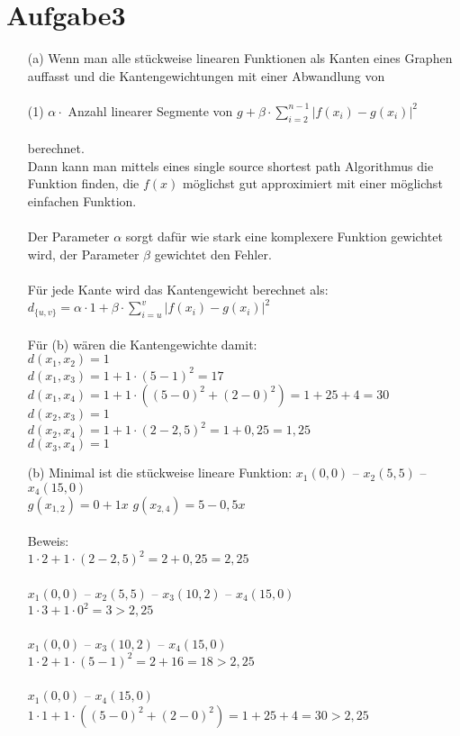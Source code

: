 \documentclass{article}
\begin{document}
\section*{Aufgabe3}
\begin{enumerate}
\item[(a)] Wenn man alle stückweise linearen Funktionen als Kanten eines Graphen auffasst und die Kantengewichtungen mit einer Abwandlung von \\\\
(1) $ \alpha \cdot$ Anzahl linearer Segmente von $g + \beta \cdot \sum_{i=2}^{n-1} \lvert f(x_i)-g(x_i) \lvert ^2$ \\\\
berechnet. \\
Dann kann man mittels eines single source shortest path Algorithmus die Funktion finden, die $f(x)$ möglichst gut approximiert mit einer möglichst einfachen Funktion. \\\\
Der Parameter $\alpha$ sorgt dafür wie stark eine komplexere Funktion gewichtet wird, der Parameter $\beta$ gewichtet den Fehler.\\\\
Für jede Kante wird das Kantengewicht berechnet als:\\
 $d_{\{u,v\}} = \alpha \cdot 1 + \beta \cdot \sum_{i=u}^{v} \lvert f(x_i)-g(x_i) \lvert ^2$\\\\
 Für (b) wären die Kantengewichte damit:\\
 $d(x_1,x_2) = 1$ \\
 $d(x_1,x_3) = 1 + 1 \cdot (5-1)^2 = 17$ \\
 $d(x_1,x_4) = 1 + 1 \cdot ((5-0)^2+(2-0)^2) = 1 + 25 + 4 = 30$ \\
 $d(x_2,x_3) = 1$ \\
 $d(x_2,x_4) = 1+1 \cdot (2-2,5)^2 = 1+0,25=1,25$ \\
 $d(x_3,x_4) = 1$\\
\item[(b)] Minimal ist die stückweise lineare Funktion: $x_1 (0,0)$ -- $x_2 (5,5)$ -- $x_4 (15,0)$ \\
$g(x_{1,2}) = 0 + 1x$ $g(x_ {2,4}) = 5 - 0,5x$ \\\\
Beweis: \\
$1 \cdot 2 + 1 \cdot (2-2,5)^2 = 2+ 0,25 = 2,25$\\\\
$x_1 (0,0)$ -- $x_2 (5,5)$ -- $x_3 (10,2)$ -- $x_4 (15,0)$ \\
$1 \cdot 3 + 1 \cdot 0^2=3>2,25$\\\\
$x_1 (0,0)$ -- $x_3 (10,2)$ -- $x_4 (15,0)$ \\
$1 \cdot 2 + 1 \cdot (5-1)^2 = 2 + 16 = 18> 2,25$\\\\
$x_1 (0,0)$ -- $x_4 (15,0)$ \\
$1 \cdot 1 + 1 \cdot ((5-0)^2+(2-0)^2) = 1 + 25 + 4 = 30 >2,25$\\
\end{enumerate}
\end{document}
